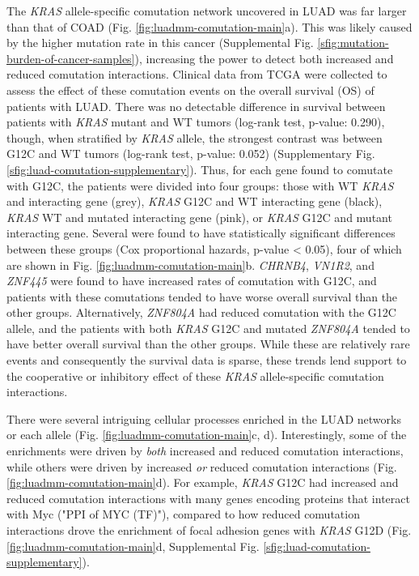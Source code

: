 \documentclass[english, 10pt, letterpaper]{article}
\newcommand{\KRAS}{\emph{KRAS}}
\begin{document}
The \KRAS{} allele-specific comutation network uncovered in LUAD was far larger than that of COAD (Fig. \ref{fig:luadmm-comutation-main}a).
This was likely caused by the higher mutation rate in this cancer (Supplemental Fig. \ref{sfig:mutation-burden-of-cancer-samples}), increasing the power to detect both increased and reduced comutation interactions.
Clinical data from TCGA \cite{CancerGenomeAtlasResearchNetwork2014} were collected to assess the effect of these comutation events on the overall survival (OS) of patients with LUAD.
There was no detectable difference in survival between patients with \KRAS{} mutant and WT tumors (log-rank test, p-value: 0.290), though, when stratified by \KRAS{} allele, the strongest contrast was between G12C and WT tumors (log-rank test, p-value: 0.052) (Supplementary Fig. \ref{sfig:luad-comutation-supplementary}).
Thus, for each gene found to comutate with G12C, the patients were divided into four groups: those with WT \KRAS{} and interacting gene (grey), \KRAS{} G12C and WT interacting gene (black), \KRAS{} WT and mutated interacting gene (pink), or \KRAS{} G12C and mutant interacting gene.
Several were found to have statistically significant differences between these groups (Cox proportional hazards, p-value < 0.05), four of which are shown in Fig. \ref{fig:luadmm-comutation-main}b.
\emph{CHRNB4}, \emph{VN1R2}, and \emph{ZNF445} were found to have increased rates of comutation with G12C, and patients with these comutations tended to have worse overall survival than the other groups.
Alternatively, \emph{ZNF804A} had reduced comutation with the G12C allele, and the patients with both \KRAS{} G12C and mutated \emph{ZNF804A} tended to have better overall survival than the other groups.
While these are relatively rare events and consequently the survival data is sparse, these trends lend support to the cooperative or inhibitory effect of these \KRAS{} allele-specific comutation interactions.

There were several intriguing cellular processes enriched in the LUAD networks or each allele (Fig. \ref{fig:luadmm-comutation-main}c, d).
Interestingly, some of the enrichments were driven by \emph{both} increased and reduced comutation interactions, while others were driven by increased \emph{or} reduced comutation interactions (Fig. \ref{fig:luadmm-comutation-main}d).
For example, \KRAS{} G12C had increased and reduced comutation interactions with many genes encoding proteins that interact with Myc ("PPI of MYC (TF)"), compared to how reduced comutation interactions drove the enrichment of focal adhesion genes with \KRAS{} G12D (Fig. \ref{fig:luadmm-comutation-main}d, Supplemental Fig. \ref{sfig:luad-comutation-supplementary}).
\end{document}
